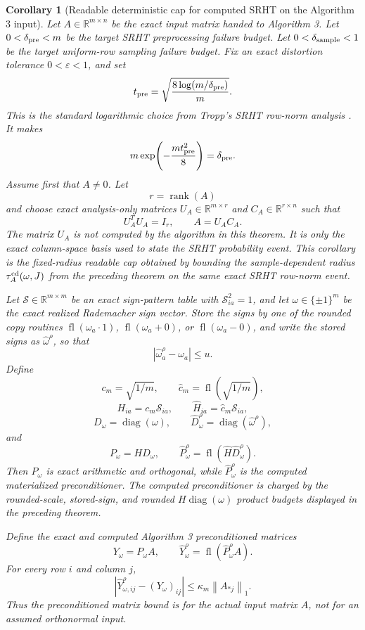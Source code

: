 \documentclass[11pt]{article}
\newcommand{\R}{\mathbb{R}}
\newcommand{\NormOne}[1]{\left\lVert #1\right\rVert_1}
\newcommand{\fl}{\operatorname{fl}}
\newcommand{\I}{I}
\newcommand{\eps}{\varepsilon}
\newcommand{\diag}{\operatorname{diag}}
\newtheorem{corollary}[theorem]{Corollary}
\theoremstyle{remark}
\begin{document}
\begin{corollary}[Readable deterministic cap for computed SRHT on the Algorithm 3 input]
Let \(A\in\R^{m\times n}\) be the exact input matrix handed to Algorithm 3.
Let \(0<\delta_{\rm pre}<m\) be the target SRHT preprocessing failure budget.
Let \(0<\delta_{\rm sample}<1\) be the target uniform-row sampling failure
budget.  Fix an exact distortion tolerance \(0<\eps<1\), and set
\[
  t_{\rm pre}
  =
  \sqrt{\frac{8\log(m/\delta_{\rm pre})}{m}} .
\]
This is the standard logarithmic choice from Tropp's SRHT row-norm analysis
\cite{Tropp2011SRHT}.  It makes
\[
  m\exp\!\left(-\frac{m t_{\rm pre}^2}{8}\right)
  =
  \delta_{\rm pre}.
\]
Assume first that \(A\ne0\).  Let
\[
  r=\operatorname{rank}(A)
\]
and choose exact analysis-only matrices \(U_A\in\R^{m\times r}\) and
\(C_A\in\R^{r\times n}\) such that
\[
  U_A^TU_A=\I_r,
  \qquad
  A=U_AC_A .
\]
The matrix \(U_A\) is not computed by the algorithm in this theorem.  It is
only the exact column-space basis used to state the SRHT probability event.
This corollary is the fixed-radius readable cap obtained by bounding the
sample-dependent radius \(\tau_A^{\rm cd}(\omega,J)\) from the preceding theorem
on the same exact SRHT row-norm event.

Let \(\mathcal S\in\R^{m\times m}\) be an exact sign-pattern table with
\(\mathcal S_{ia}^2=1\), and let
\(\omega\in\{\pm1\}^m\) be the exact realized Rademacher sign vector.  Store
the signs by one of the rounded copy routines
\(\fl(\omega_a\cdot1)\), \(\fl(\omega_a+0)\), or \(\fl(\omega_a-0)\), and
write the stored signs as \(\widehat\omega^\rho\), so that
\[
  |\widehat\omega^\rho_a-\omega_a|\le u .
\]
Define
\[
  c_m=\sqrt{1/m},\qquad \widehat c_m=\fl(\sqrt{1/m}),
\]
\[
  H_{ia}=c_m\mathcal S_{ia},
  \qquad
  \widehat H_{ia}=\widehat c_m\mathcal S_{ia},
\]
\[
  D_\omega=\diag(\omega),\qquad
  \widehat D_\omega^\rho=\diag(\widehat\omega^\rho),
\]
and
\[
  P_\omega=HD_\omega,\qquad
  \widehat P_\omega^\rho=\fl(\widehat H\widehat D_\omega^\rho).
\]
Then \(P_\omega\) is exact arithmetic and orthogonal, while
\(\widehat P_\omega^\rho\) is the computed materialized preconditioner.  The
computed preconditioner is charged by the rounded-scale, stored-sign, and
rounded \(H\diag(\omega)\) product budgets displayed in the preceding theorem.

Define the exact and computed Algorithm 3 preconditioned matrices
\[
  Y_\omega=P_\omega A,
  \qquad
  \widehat Y_\omega^\rho=\fl(\widehat P_\omega^\rho A).
\]
For every row \(i\) and column \(j\),
\[
  |\widehat Y^\rho_{\omega,ij}-(Y_\omega)_{ij}|
  \le
  \kappa_m\NormOne{A_{*j}} .
\]
Thus the preconditioned matrix bound is for the actual input matrix \(A\), not
for an assumed orthonormal input.


\end{corollary}
\end{document}
